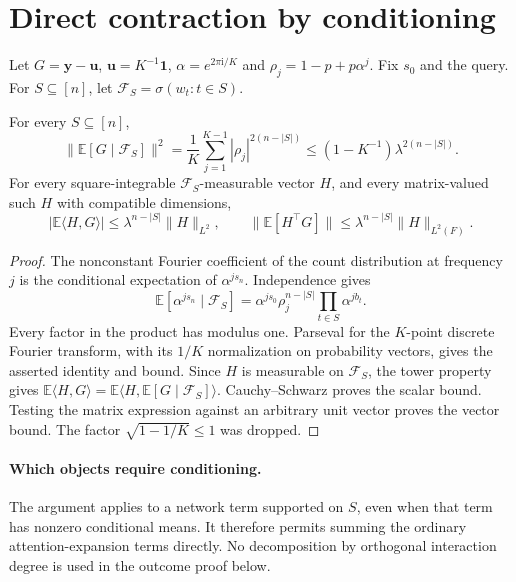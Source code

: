 \section{Direct contraction by conditioning}\label{sec:conditioning}
Let $G=\bm y-\bm u$, $\bm u=K^{-1}\bm1$, $\alpha=e^{2\pi\mathrm i/K}$ and $\rho_j=1-p+p\alpha^j$. Fix $s_0$ and the query. For $S\subseteq[n]$, let $\mathcal F_S=\sigma(w_t:t\in S)$.

\begin{lemma}\label{lem:conditional-target}
For every $S\subseteq[n]$,
\[
 \|\mathbb E[G\mid\mathcal F_S]\|^2
 =\frac1K\sum_{j=1}^{K-1}|\rho_j|^{2(n-|S|)}
 \le (1-K^{-1})\lambda^{2(n-|S|)}.
\]
For every square-integrable $\mathcal F_S$-measurable vector $H$, and every matrix-valued such $H$ with compatible dimensions,
\[
 |\mathbb E\langle H,G\rangle|\le\lambda^{n-|S|}\|H\|_{L^2},\qquad
 \|\mathbb E[H^\top G]\|\le\lambda^{n-|S|}\|H\|_{L^2(F)}.
\]
\end{lemma}
\begin{proof}
The nonconstant Fourier coefficient of the count distribution at frequency $j$ is the conditional expectation of $\alpha^{js_n}$. Independence gives
\[
 \mathbb E[\alpha^{js_n}\mid\mathcal F_S]
 =\alpha^{js_0}\rho_j^{n-|S|}\prod_{t\in S}\alpha^{jb_t}.
\]
Every factor in the product has modulus one. Parseval for the $K$-point discrete Fourier transform, with its $1/K$ normalization on probability vectors, gives the asserted identity and bound. Since $H$ is measurable on $\mathcal F_S$, the tower property gives $\mathbb E\langle H,G\rangle=\mathbb E\langle H,\mathbb E[G\mid\mathcal F_S]\rangle$. Cauchy--Schwarz proves the scalar bound. Testing the matrix expression against an arbitrary unit vector proves the vector bound. The factor $\sqrt{1-1/K}\le1$ was dropped.
\end{proof}

\paragraph{Which objects require conditioning.} The argument applies to a network term supported on $S$, even when that term has nonzero conditional means. It therefore permits summing the ordinary attention-expansion terms directly. No decomposition by orthogonal interaction degree is used in the outcome proof below.

